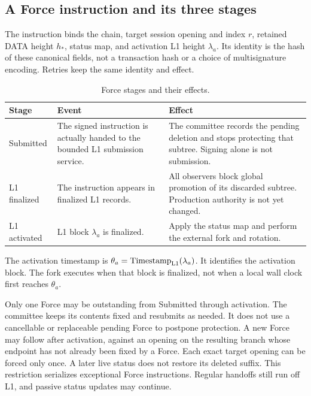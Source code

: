 \documentclass[11pt,a4paper]{article}
\begin{document}
\subsection{A Force instruction and its three stages}
\label{sec:force-stages}
The instruction binds the chain, target session opening and index $r$,
retained DATA height $h_*$, status map, and activation L1 height
$\lambda_a$. Its identity is the hash of these canonical fields, not a
transaction hash or a choice of multisignature encoding. Retries keep
the same identity and effect.

\begin{table}[htbp]\centering\small
\caption{Force stages and their effects.}\label{tab:force-stages}
\begin{tabularx}{\linewidth}{@{}p{.19\linewidth}Y Y@{}}\toprule
Stage & Event & Effect\\\midrule
Submitted & The signed instruction is actually handed to the bounded
L1 submission service. & The committee records the pending deletion
and stops protecting that subtree. Signing alone is not submission.\\
L1 finalized & The instruction appears in finalized L1 records. & All
observers block global promotion of its discarded subtree. Production
authority is not yet changed.\\
L1 activated & L1 block $\lambda_a$ is finalized. & Apply the status map
and perform the external fork and rotation.\\\bottomrule
\end{tabularx}
\end{table}
The activation timestamp is
$\theta_a=\operatorname{Timestamp}_{\rm L1}(\lambda_a)$. It identifies
the activation block. The fork executes when that block is finalized,
not when a local wall clock first reaches $\theta_a$.

Only one Force may be outstanding from Submitted through activation.
The committee keeps its contents fixed and resubmits as needed. It does
not use a cancellable or replaceable pending Force to postpone protection.
A new Force may follow after activation, against an opening on the
resulting branch whose endpoint has not already been fixed by a Force.
Each exact target opening can be forced only once. A later live status
does not restore its deleted suffix.
This restriction serializes exceptional Force instructions. Regular
handoffs still run off L1, and passive status updates may continue.
\end{document}
